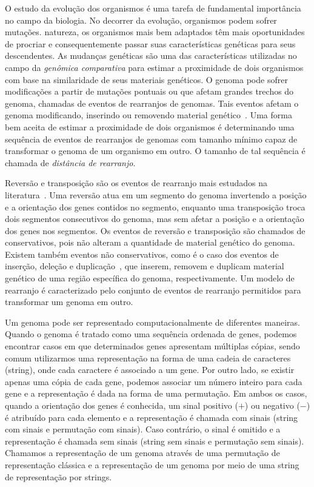 
O estudo da evolução dos organismos é uma tarefa de fundamental importância no campo da biologia. No decorrer da evolução, organismos podem sofrer mutações. natureza, os organismos mais bem adaptados têm mais oportunidades de procriar e consequentemente passar suas características genéticas para seus descendentes. As mudanças genéticas são uma das características utilizadas no campo da \emph{genômica comparativa} para estimar a proximidade de dois organismos com base na similaridade de seus materiais genéticos. O genoma pode sofrer modificações a partir de mutações pontuais ou que afetam grandes trechos do genoma, chamadas de eventos de rearranjos de genomas. Tais eventos afetam o genoma modificando, inserindo ou removendo material genético~\cite{2009-fertin-etal}. Uma forma bem aceita de estimar a proximidade de dois organismos é determinando uma sequência de eventos de rearranjos de genomas com tamanho mínimo capaz de transformar o genoma de um organismo em outro. O tamanho de tal sequência é chamada de \emph{distância de rearranjo}.

Reversão e transposição são os eventos de rearranjo mais estudados na literatura~\cite{1999-hannenhalli-pevzner,1999b-caprara,2012-bulteau-etal,2019b-oliveira-etal}. Uma reversão atua em um segmento do genoma invertendo a posição e a orientação dos genes contidos no segmento, enquanto uma transposição troca dois segmentos consecutivos do genoma, mas sem afetar a posição e a orientação dos genes nos segmentos. Os eventos de reversão e transposição são chamados de conservativos, pois não alteram a quantidade de material genético do genoma. Existem também eventos não conservativos, como é o caso dos eventos de inserção, deleção e duplicação~\cite{2013-willing-etal,2012-elmabrouk-sankoff,2008-kahn-raphael,2020-mane-etal,2009-bader}, que inserem, removem e duplicam material genético de uma região específica do genoma, respectivamente. Um modelo de rearranjo é caracterizado pelo conjunto de eventos de rearranjo permitidos para transformar um genoma em outro.

Um genoma pode ser representado computacionalmente de diferentes maneiras. Quan\-do o genoma é tratado como uma sequência ordenada de genes, podemos encontrar casos em que determinados genes apresentam múltiplas cópias, sendo comum utilizarmos uma representação na forma de uma cadeia de caracteres (string), onde cada caractere é associado a um gene. Por outro lado, se existir apenas uma cópia de cada gene, podemos associar um número inteiro para cada gene e a representação é dada na forma de uma permutação. Em ambos os casos, quando a orientação dos genes é conhecida, um sinal positivo ($+$) ou negativo ($-$) é atribuído para cada elemento e a representação é chamada com sinais (string com sinais e permutação com sinais). Caso contrário, o sinal é omitido e a representação é chamada sem sinais (string sem sinais e permutação sem sinais). Chamamos a representação de um genoma através de uma permutação de representação clássica e a representação de um genoma por meio de uma string de representação por strings.

